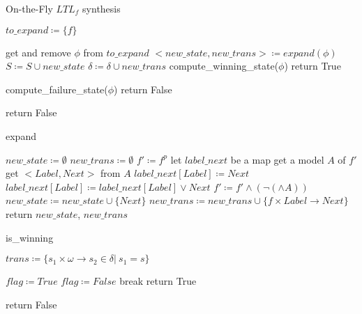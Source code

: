 \documentclass[10pt]{article}
\begin{document}
\begin{algorithm}[h]
\Large
\caption{On-the-Fly $LTL_f$ synthesis}
\label{algo:syn}
$to\_expand \coloneqq\{f\}$\;
{
    get and remove $\phi$ from $to\_expand$\;
    $<new\_state,new\_trans>\coloneqq expand(\phi)$\;
    $S\coloneqq S\cup new\_state$\;
    $\delta\coloneqq \delta\cup new\_trans$\;
    {
        compute\_winning\_state($\phi$)\;
        {
            return True\;
        }
    }
    {
        compute\_failure\_state($\phi$)\;
        {
            return False\;
        }
        
    }
}
return False\;   

\end{algorithm}


\begin{algorithm}[h]
\Large
\caption{expand}
\label{algo:expand}
$new\_state\coloneqq\emptyset$\;
$new\_trans\coloneqq\emptyset$\;
$f'\coloneqq f^p$\;
let $label\_next$ be a map\;
{
    get a model $A$ of $f'$\;
    get $<Label,Next>$ from $A$\;
    {
        $label\_next[Label]\coloneqq Next$\;
    }
    \Else
    {
        $label\_next[Label]\coloneqq label\_next[Label]\vee Next$\;
    }
    $f'\coloneqq f'\wedge(\neg(\wedge A))$\;
}
{
    $new\_state\coloneqq new\_state\cup\{Next\}$\;
    $new\_trans\coloneqq new\_trans\cup\{f\times Label\to Next\}$\;
}
return $new\_state$, $new\_trans$\;
\end{algorithm}

\begin{algorithm}[h]
\Large
\caption{is\_winning}
\label{algo:is_win}
$trans\coloneqq\{s_1\times\omega\to s_2\in\delta|\ s_1=s\}$\;
{
    $flag\coloneqq True$\;
    {
        {
            $flag\coloneqq False$\;
            break\;
        }
    }
    {
        return True\;
    }
    
}
return False\;
\end{algorithm}
\end{document}
